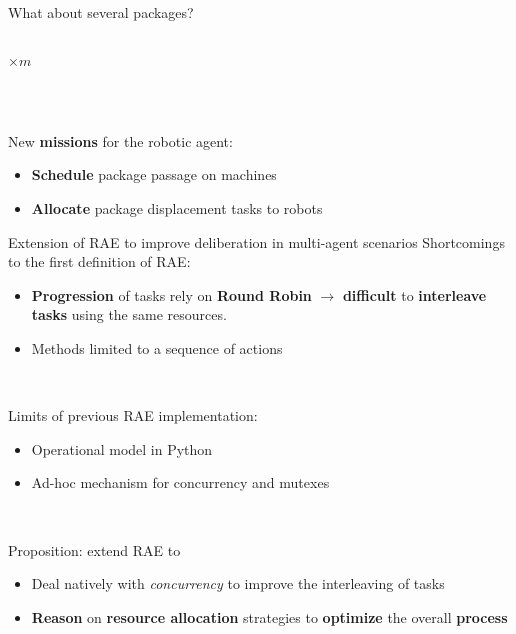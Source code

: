 \begin{frame}{What about several packages?}
\begin{columns}
\begin{column}{0.5\textwidth}
            \LARGE $\times m$
        \end{column}
    \end{columns}
    
    ~
\pause

    New \textbf{missions} for the robotic agent:
    \begin{itemize}
        \pause
        \item \textbf{Schedule} package passage on machines
        \pause
        \item \textbf{Allocate} package displacement tasks to robots
    \end{itemize}

    \centering
\end{frame}

\begin{frame}{Extension of RAE to improve deliberation in multi-agent scenarios}
    Shortcomings to the first definition of RAE:
    {\small
    \begin{itemize}
        \pause
        \item \textbf{Progression} of tasks rely on \textbf{Round Robin} \pause$\rightarrow$ \textbf{difficult} to \textbf{interleave tasks} using the same resources.
        \pause
        \item Methods limited to a sequence of actions
    \end{itemize}}

    ~~

    \pause
    Limits of previous RAE implementation:
    {\small
    \begin{itemize}
        \item Operational model in Python
        \item Ad-hoc mechanism for concurrency and mutexes
    \end{itemize}}
    ~~
    
\pause
    Proposition: extend RAE to
    {\small
    \begin{itemize}
        \pause
        \item Deal natively with \textit{concurrency} to improve the interleaving of tasks
        \pause
        \item \textbf{Reason} on \textbf{resource allocation} strategies to \textbf{optimize} the overall \textbf{process}
    \end{itemize}}
\end{frame}